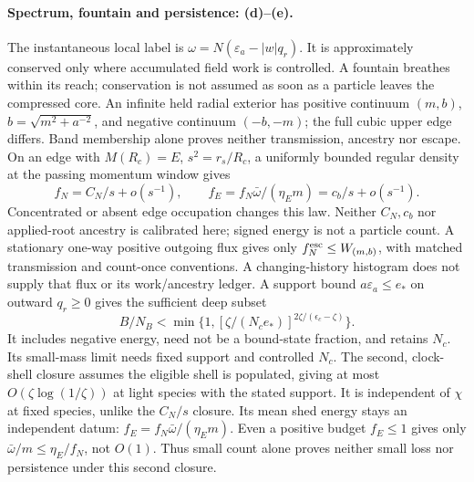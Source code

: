 \documentclass[10pt]{article}
\begin{document}
\paragraph{Spectrum, fountain and persistence: (d)--(e).}
The instantaneous local label is
\(\omega=N(\varepsilon_a-|w|q_r)\).
It is approximately conserved only where accumulated
field work is controlled. A fountain breathes within its
reach; conservation is not assumed as soon as a particle
leaves the compressed core.
An infinite held radial exterior has positive continuum
\((m,b)\), \(b=\sqrt{m^2+a^{-2}}\), and negative continuum
\((-b,-m)\); the full cubic upper edge differs.
Band membership alone proves neither transmission,
ancestry nor escape. On an edge with \(M(R_c)=E\),
\(s^2=r_s/R_c\), a uniformly bounded regular density
at the passing momentum window gives
\[
 f_N=C_N/s+o(s^{-1}),\qquad
 f_E=f_N\bar\omega/(\eta_E m)=c_b/s+o(s^{-1}).
\]
Concentrated or absent edge occupation changes this
law. Neither \(C_N,c_b\) nor applied-root ancestry is
calibrated here; signed energy is not a particle count.
A stationary one-way positive outgoing flux gives only
\(f_N^{\rm esc}\le W_{(m,b)}\), with matched transmission
and count-once conventions. A changing-history histogram
does not supply that flux or its work/ancestry ledger.
A support bound \(a\varepsilon_a\le e_*\) on outward
\(q_r\ge0\) gives the sufficient deep subset
\[
 B/N_B<
 \min\{1,[\zeta/(N_ce_*)]^{2\zeta/(\epsilon_c-\zeta)}\}.
\]
It includes negative energy, need not be a bound-state
fraction, and retains \(N_c\). Its small-mass limit
needs fixed support and controlled \(N_c\).
The second, clock-shell closure assumes the eligible shell
is populated, giving at most
\(O(\zeta\log(1/\zeta))\) at light species with the
stated support. It is independent of \(\chi\) at fixed
species, unlike the \(C_N/s\) closure. Its mean shed
energy stays an independent datum:
\(f_E=f_N\bar\omega/(\eta_E m)\). Even a positive
budget \(f_E\le1\) gives only
\(\bar\omega/m\le\eta_E/f_N\), not \(O(1)\).
Thus small count alone proves neither small loss nor
persistence under this second closure.
\end{document}
